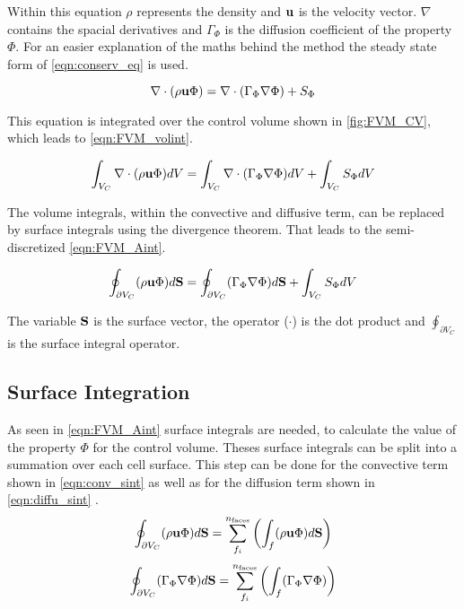 \documentclass[../thesis.tex]{subfiles}
\begin{document}
Within this equation $ \rho $ represents the density and $ \bold{u} $ is the velocity vector. $ \nabla $ contains the spacial derivatives and $ \Gamma_\Phi $ is the diffusion coefficient of the property $ \Phi $.
For an easier explanation of the maths behind the method the steady state form of \autoref{eqn:conserv_eq} is used.

\begin{equation}
	\nabla \cdot (\rho \bold{u} \Phi) = \nabla \cdot (\Gamma_\Phi \nabla \Phi) + S_\Phi
\end{equation}

This equation is integrated over the control volume shown in \autoref{fig:FVM_CV}, which leads to \autoref{eqn:FVM_volint}.

\begin{equation}
	\label{eqn:FVM_volint}
	\int_{V_C} \nabla \cdot (\rho \bold{u} \Phi) dV = \int_{V_C} \nabla \cdot (\Gamma_\Phi \nabla \Phi) dV + \int_{V_C} S_\Phi dV
\end{equation}

The volume integrals, within the convective and diffusive term, can be replaced by surface integrals using the divergence theorem. That leads to the semi-discretized \autoref{eqn:FVM_Aint}.

\begin{equation}
	\label{eqn:FVM_Aint}
	\oint_{\partial V_C} (\rho \bold{u} \Phi) d\bold{S} = \oint_{\partial V_C} (\Gamma_\Phi \nabla \Phi) d\bold{S} + \int_{V_C} S_\Phi dV
\end{equation}

The variable $ \bold{S}$ is the surface vector, the operator ($\cdot$) is the dot product and $ \oint_{\partial V_C}$ is the surface integral operator.

\subsection{Surface Integration}

As seen in \autoref{eqn:FVM_Aint} surface integrals are needed, to calculate the value of the property $\Phi$ for the control volume. Theses surface integrals can be split into a summation over each cell surface. This step can be done for the convective term shown in \autoref{eqn:conv_sint} as well as for the diffusion term shown in \autoref{eqn:diffu_sint} \cite{darwish2021finite}.
\begin{equation}
	\label{eqn:conv_sint}
	\oint_{\partial V_C} (\rho \bold{u} \Phi) d\bold{S} = \sum_{f_i}^{n_{\text{faces}}}\left( \int_{f} (\rho \bold{u} \Phi) d\bold{S} \right)
\end{equation}
\begin{equation}
	\label{eqn:diffu_sint}
	\oint_{\partial V_C} (\Gamma_\Phi \nabla \Phi) d\bold{S} =  \sum_{f_i}^{n_{\text{faces}}}\left( \int_{f} (\Gamma_\Phi \nabla \Phi) \right)
\end{equation} 
\end{document}

